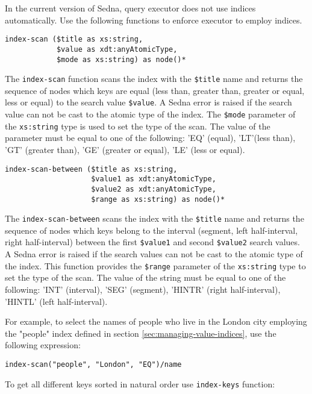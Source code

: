 \documentclass[a4paper,12pt]{article}
\begin{document}
In the current version of Sedna, query executor does not use indices
automatically. Use the following functions to enforce executor to employ
indices.

\begin{verbatim}
index-scan ($title as xs:string,
            $value as xdt:anyAtomicType,
            $mode as xs:string) as node()*
\end{verbatim}

The \verb!index-scan! function scans the index with the \verb!$title! name and
returns the sequence of nodes which keys are equal (less than, greater than,
greater or equal, less or equal) to the search value \verb!$value!. A Sedna
error is raised if the search value can not be cast to the atomic type of the
index. The \verb!$mode! parameter of the \verb!xs:string! type is used to set
the type of the scan. The value of the parameter must be equal to one of the
following: 'EQ' (equal), 'LT'(less than), 'GT' (greater than), 'GE' (greater or
equal), 'LE' (less or equal).

\begin{verbatim}
index-scan-between ($title as xs:string,
                    $value1 as xdt:anyAtomicType,
                    $value2 as xdt:anyAtomicType,
                    $range as xs:string) as node()*
\end{verbatim}

The \verb!index-scan-between! scans the index with the \verb!$title! name and
returns the sequence of nodes which keys belong to the interval (segment, left
half-interval, right half-interval) between the first \verb!$value1! and second
\verb!$value2! search values. A Sedna error is raised if the search values can
not be cast to the atomic type of the index. This function provides the
\verb!$range! parameter of the \verb!xs:string! type to set the type of the
scan. The value of the string must be equal to one of the following: 'INT'
(interval), 'SEG' (segment), 'HINTR' (right half-interval), 'HINTL' (left
half-interval).

For example, to select the names of people who live in the London city employing
the "people" index defined in section \ref{sec:managing-value-indices}, use the
following expression:

\begin{verbatim}
index-scan("people", "London", "EQ")/name
\end{verbatim}

To get all different keys sorted in natural order use \verb!index-keys!
function:
\end{document}
